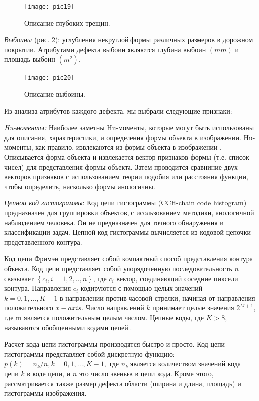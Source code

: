\documentclass[a4paper,14pt]{extreport}
\begin{document}
\begin{figure}[ht!]
\centering
\texttt{[image: pic19]}
\caption{Описание глубоких трещин.}
	\label{pic19}
		\end{figure} 
		
\textit{Выбоины } (рис. \ref{pic20}): углубления некруглой формы различных размеров в дорожном покрытии. Атрибутами дефекта выбоин  являются глубина выбоин $(mm)$ и площадь выбоин $(m^2)$.

\begin{figure}[ht!]
\centering
\texttt{[image: pic20]}
\caption{Описание выбоины.}
	\label{pic20}
		\end{figure} 

Из анализа атрибутов каждого дефекта, мы выбрали следующие признаки:

\textit{Hu-моменты:} Наиболее заметны Hu-моменты, которые могут быть использованы для описания, характеристики, и определения формы объекта в изображении. Hu-моменты, как правило, извлекаются из формы объекта в изображении \cite{h130}. Описывается форма объекта и извлекается вектор признаков формы (т.е. список чисел) для представления формы объекта. Затем проводится сравниние двух векторов признаков с использованием теории подобия или расстояния функции, чтобы определить, насколько формы анологичны.

\textit{Цепной код гистограммы}: Код цепи гистограммы (CCH-chain code histogram) предназначен для группировки объектов, с исользованием методики, анологичной  наблюдением человека\cite{h131}. Он не предназначен для точного обнаружения и классификации задач. Цепной код гистограммы вычисляется из кодовой цепочки представленного контура.

Код цепи Фримэн \cite{h132} представляет собой компактный способ представления контура объекта. Код цепи представляет собой упорядоченную последовательность $n$ связывает $\left\{c_i, i=1,2,.., n\right\}$, где $c_i$ вектор, соединяющий соседние пиксели контура. Направления $c_i$ кодируются с помощью целых значений $k=0,1,...,K-1$ в направлении против часовой стрелки, начиная от направления положительного $x-axis$. Число направлений $k$ принимает целые значения $2^{M+1}$, где m является положительным целым числом. Цепные коды, где $K>8$, называются обобщенными кодами цепей \cite{h133}.

Расчет кода цепи гистограммы производится быстро и просто. Код цепи гистограммы представляет собой дискретную функцию: $p(k)=n_k/n, k=0,1,...,K-1,$ где $n_k$ является количеством значений кода цепи  $k$ в коде цепи, и $n$ это число звеньев в цепи кода. Кроме этого, рассматривается также размер дефекта области (ширина и длина, площадь) и гистограммы изображения. 
\end{document}
